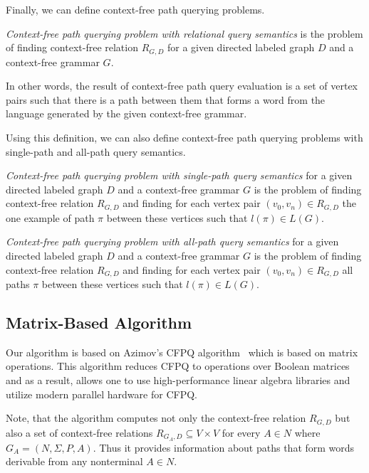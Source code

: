 Finally, we can define context-free path querying problems.
\begin{definition}
    \emph{Context-free path querying problem with relational query semantics} is the problem of finding context-free relation $R_{G, D}$ for a given directed labeled graph $D$ and a context-free grammar $G$.
\end{definition}

In other words, the result of context-free path query evaluation is a set of vertex pairs such that there is a path between them that forms a word from the language generated by the given context-free grammar.

Using this definition, we can also define context-free path querying problems with single-path and all-path query semantics.

\begin{definition}
	\emph{Context-free path querying problem with single-path query semantics} for a given directed labeled graph $D$ and a context-free grammar $G$ is the problem of finding context-free relation $R_{G, D}$ and finding for each vertex pair $(v_0, v_n) \in R_{G, D}$ the one example of path $\pi$ between these vertices such that $l(\pi) \in L(G)$.
\end{definition}

\begin{definition}
	\emph{Context-free path querying problem with all-path query semantics} for a given directed labeled graph $D$ and a context-free grammar $G$ is the problem of finding context-free relation $R_{G, D}$ and finding for each vertex pair $(v_0, v_n) \in R_{G, D}$ all paths $\pi$ between these vertices such that $l(\pi) \in L(G)$.
\end{definition}


\subsection{Matrix-Based Algorithm}
Our algorithm is based on Azimov's CFPQ algorithm~\cite{Azimov:2018:CPQ:3210259.3210264} which is based on matrix operations.
This algorithm reduces CFPQ to operations over Boolean matrices and as a result, allows one to use high-performance linear algebra libraries and utilize modern parallel hardware for CFPQ.

Note, that the algorithm computes not only the context-free relation $R_{G,D}$ but also a set of context-free relations $R_{G_A,D} \subseteq V \times V$ for every $A \in N$ where $G_A = (N, \Sigma, P, A)$.
Thus it provides information about paths that form words derivable from any nonterminal $A \in N$.

